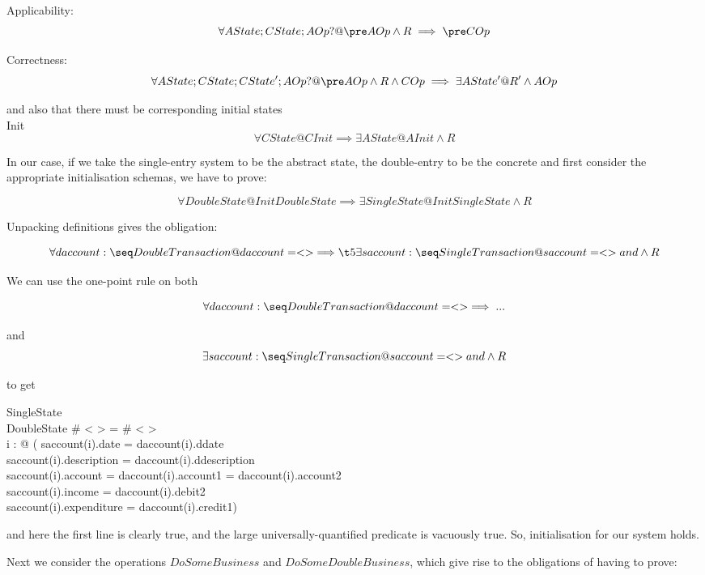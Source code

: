 \documentclass[11pt]{amsart}
\begin{document}
\noindent Applicability:
\[
\forall AState; CState; AOp? @ \pre AOp \land R \implies \pre COp
\]

\noindent Correctness:
\[
\forall AState; CState; CState'; AOp? @ \pre AOp \land R \land COp \implies \exists AState' @ R' \land AOp
\]

\noindent and also that there must be corresponding initial states\\

\noindent Init
\[
\forall CState @ CInit \implies \exists AState @ AInit \land R
\]

In our case, if we take the single-entry system to be the abstract state, the double-entry to be the concrete and first consider the appropriate initialisation schemas, we have to prove:

\[
\forall DoubleState  @ InitDoubleState \implies \exists SingleState  @ InitSingleState \land R
\]

Unpacking definitions gives the obligation:

\[
\forall daccount : \seq DoubleTransaction @ daccount = < > \implies\\
\t5 \exists saccount : \seq SingleTransaction @ saccount = < > and \land R
\]

We can use the one-point rule on both

\[
\forall daccount : \seq DoubleTransaction @ daccount = < > \implies...
\]

and
\[
\exists saccount : \seq SingleTransaction @ saccount = < > and \land R
\]

to get

\begin{schema}{}
SingleState\\
DoubleState
\where
\# < > = \# < >\\
\forall i : \dom < > @ (
saccount(i).date = daccount(i).ddate \land\\
saccount(i).description = daccount(i).ddescription \land\\
saccount(i).account = daccount(i).account1 = daccount(i).account2 \land\\
saccount(i).income = daccount(i).debit2 \land\\
saccount(i).expenditure = daccount(i).credit1)
\end{schema}

\noindent and here the first line is clearly true, and the large universally-quantified predicate is vacuously true. So, initialisation for our system holds.

Next we consider the operations $DoSomeBusiness$ and $DoSomeDoubleBusiness$, which give rise to the obligations of having to prove:
\end{document}
